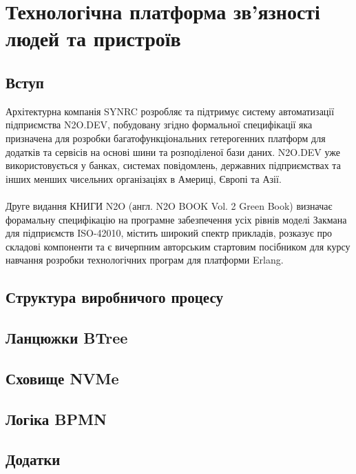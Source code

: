 \chapter{Технологічна платформа зв'язності людей та пристроїв}

\section{Вступ}

Архітектурна компанія SYNRC розробляє та підтримує систему автоматизації підприємства N2O.DEV,
побудовану згідно формальної специфікації яка призначена для розробки багатофункціональних
гетерогенних платформ для додатків та сервісів на основі шини та розподіленої бази даних.
N2O.DEV уже використовується у банках, системах повідомлень, державних підприємствах та
інших менших чисельних організаціях в Америці, Європі та Азії.
\\
\\
Друге видання КНИГИ N2O (англ. N2O BOOK Vol. 2 Green Book) визначає форамальну специфікацію
на програмне забезпечення усіх рівнів моделі Закмана для підприємств ISO-42010, містить
широкий спектр прикладів, розказує про складові компоненти та є вичерпним авторським
стартовим посібником для курсу навчання розробки технологічних програм для платформи Erlang.

\section{Структура виробничого процесу}

\section{Ланцюжки BTree}

\section{Сховище NVMe}

\section{Логіка BPMN}

\section{Додатки}
